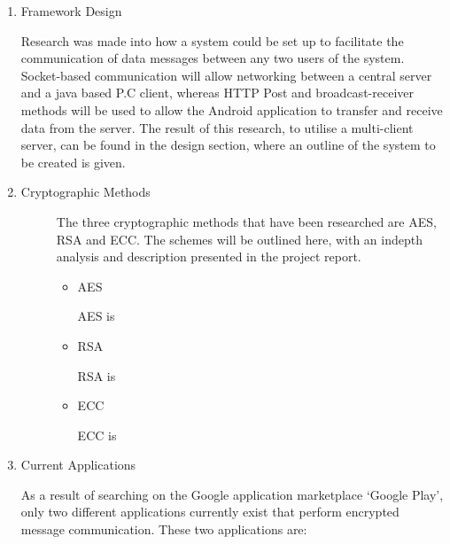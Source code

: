 \documentclass[a4paper,11pt]{article}
\begin{document}
\begin{enumerate}
  \item
  \begin{description}
    \item[Framework Design] 
  \end{description}
  Research was made into how a system could be set up to facilitate the communication of data messages between any two users of the system. Socket-based communication will allow networking between a central server and a java based P.C client, whereas HTTP Post and broadcast-receiver methods will be used to allow the Android application to transfer and receive data from the server. The result of this research, to utilise a multi-client server, can be found in the design section, where an outline of the system to be created is given.
  \item
  \begin{description}
    \item[Cryptographic Methods] 
    The three cryptographic methods that have been researched are AES, RSA and ECC. The schemes will be outlined here, with an indepth analysis and description presented in the project report.
    \begin{itemize}
      \item
      \begin{description}
        \item[AES] 
      \end{description}
      AES is
      \item
      \begin{description}
        \item[RSA] 
      \end{description}
      RSA is
      \item
      \begin{description}
        \item[ECC] 
      \end{description}
      ECC is
    \end{itemize}
  \end{description}
  \item
  \begin{description}
    \item[Current Applications] 
  \end{description}
  As a result of searching on the Google application marketplace ‘Google Play’, only two different applications currently exist that perform encrypted message communication. These two applications are:

\end{enumerate}
\end{document}
